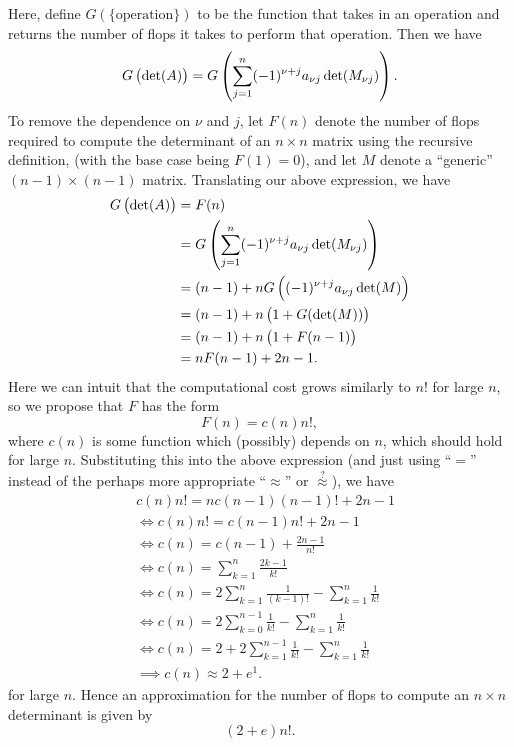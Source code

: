 \documentclass{article}
\begin{document}
Here, define $G(\text{\{operation\}})$ to be the function that takes in
an operation and returns the number of flops it takes to perform that
operation. Then we have
%
\begin{equation*}
    G\del{ \det(A) }
        = G\del{ \sum_{j = 1}^n (-1)^{\nu + j} a_{\nu j} \det(M_{\nu j}) }
        .
\end{equation*}
%
To remove the dependence on $\nu$ and $j$, let $F(n)$ denote
the number of flops required to compute the determinant of
an $n \times n$ matrix using the recursive definition,
(with the base case being $F(1) = 0$), and let $M$ denote a ``generic''
$(n - 1) \times (n - 1)$ matrix.
Translating our above expression, we have
%
\begin{align*}
    G\del{ \det(A) }
        &= F(n) \\
        &= G\del{ \sum_{j = 1}^n (-1)^{\nu + j} a_{\nu j} \det(M_{\nu j}) } \\
        &= (n - 1) + n G\del{ (-1)^{\nu + j} a_{\nu j} \det(M) } \\
        &= (n - 1) + n \del{ 1 + G(\det(M)) } \\
        &= (n - 1) + n \del{1 + F(n - 1)} \\
        &= n F(n - 1)  + 2n - 1
        .
\end{align*}
%
Here we can intuit that the computational cost grows similarly to $n!$ for large $n$,
so we propose that $F$ has the form
%
\begin{equation*}
    F(n) = c(n) n!
    ,
\end{equation*}
%
where $c(n)$ is some function which (possibly) depends on $n$, which should hold for large $n$.
Substituting this into the above expression
(and just using ``$=$'' instead of the perhaps more appropriate ``$\approx$'' or
$\stackrel{?}{\approx}$), we have
%
\begin{align*}
    &c(n) n! = n c(n - 1) (n - 1)! + 2 n - 1 \\
    &\iff c(n) n! = c(n - 1) n! + 2 n - 1 \\
    &\iff c(n) = c(n - 1) + \frac{2 n - 1}{n!} \\
    &\iff c(n) = \sum_{k = 1}^n \frac{2 k - 1}{k!} \\
    &\iff c(n) =
        2 \sum_{k = 1}^n \frac{1}{(k - 1)!}
        - \sum_{k = 1}^n \frac{1}{k!} \\
    &\iff c(n) =
        2 \sum_{k = 0}^{n - 1} \frac{1}{k!}
        - \sum_{k = 1}^n \frac{1}{k!} \\
    &\iff c(n) =
        2  + 2 \sum_{k = 1}^{n - 1} \frac{1}{k!}
        - \sum_{k = 1}^n \frac{1}{k!} \\
    &\implies c(n) \approx 2 + e^1
    .
\end{align*}
%
for large $n$. Hence an approximation for the number of flops to compute
an $n \times n$ determinant is given by
%
\begin{equation*}
    (2 + e) n!
    .
\end{equation*}
\end{document}
